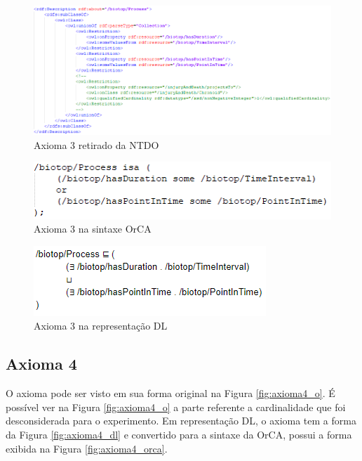 \documentclass{bcc}
\begin{document}
\begin{figure}[H]
\centering
\includegraphics[width=1\textwidth]{Figuras/axioma3_o.png}
\caption{Axioma 3 retirado da NTDO} 
\label{fig:axioma3_o}
\end{figure}

\begin{figure}[H]
\centering
\includegraphics[width=.6\textwidth]{Figuras/axioma3_orca.png}
\caption{Axioma 3 na sintaxe OrCA} 
\label{fig:axioma3_orca}
\end{figure}

\begin{figure}[H]
\centering
\includegraphics[width=.5\textwidth]{Figuras/axioma3_dl.png}
\caption{Axioma 3 na representação DL} 
\label{fig:axioma3_dl}
\end{figure}

\subsection{Axioma 4}
O axioma pode ser visto em sua forma original na Figura \ref{fig:axioma4_o}. É possível ver na Figura \ref{fig:axioma4_o} a parte referente a cardinalidade que foi desconsiderada para o experimento. Em representação DL, o axioma tem a forma da Figura \ref{fig:axioma4_dl} e convertido para a sintaxe da OrCA, possui a forma exibida na Figura \ref{fig:axioma4_orca}. 
\end{document}
